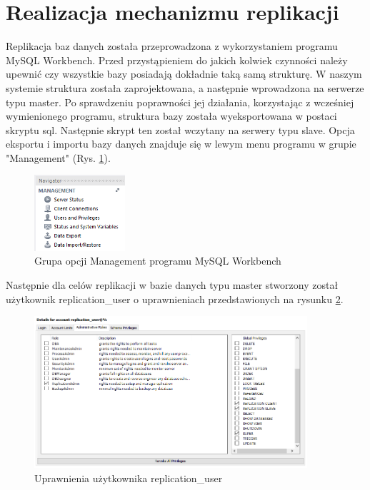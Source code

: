 \documentclass{mgr}
\begin{document}
\section{Realizacja mechanizmu replikacji}
Replikacja baz danych została przeprowadzona z wykorzystaniem programu MySQL Workbench. Przed przystąpieniem do jakich kolwiek czynności należy upewnić czy wszystkie bazy posiadają dokładnie taką samą strukturę. W naszym systemie struktura została zaprojektowana, a następnie wprowadzona na serwerze typu master. Po sprawdzeniu poprawności jej działania, korzystając z wcześniej wymienionego programu, struktura bazy została wyeksportowana w postaci skryptu sql. Następnie skrypt ten został wczytany na serwery typu slave. Opcja eksportu i importu bazy danych znajduje się w lewym menu programu w grupie "Management" (Rys. \ref{fig:wb-management}).

\begin{figure}[!ht]
	\centering
	\includegraphics[width=0.3\textwidth]{images/wb_management.png}
	\caption{Grupa opcji Management programu MySQL Workbench}
	\label{fig:wb-management}
\end{figure}

Następnie dla celów replikacji w bazie danych typu master stworzony został użytkownik replication\_user o uprawnieniach przedstawionych na rysunku \ref{fig:wb-users-privileges}.

\begin{figure}[!ht]
	\centering
	\includegraphics[width=0.9\textwidth]{images/wb_users_privileges.png}
	\caption{Uprawnienia użytkownika replication\_user}
	\label{fig:wb-users-privileges}
\end{figure}
\end{document}
